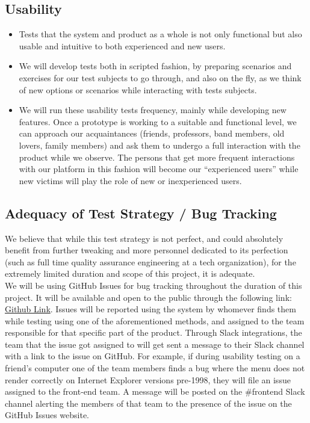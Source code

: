 \documentclass[11pt]{article}
\begin{document}
\subsection{Usability}
\begin{itemize}
    \item Tests that the system and product as a whole is not only functional but also usable and intuitive to both experienced and new users.
    \item We will develop tests both in scripted fashion, by preparing scenarios and exercises for our test subjects to go through, and also on the fly, as we think of new options or scenarios while interacting with tests subjects.
    \item We will run these usability tests frequency, mainly while developing new features. Once a prototype is working to a suitable and functional level, we can approach our acquaintances (friends, professors, band members, old lovers, family members) and ask them to undergo a full interaction with the product while we observe. The persons that get more frequent interactions with our platform in this fashion will become our ``experienced users'' while new victims will play the role of new or inexperienced users.
\end{itemize}

\subsection{Adequacy of Test Strategy / Bug Tracking}

We believe that while this test strategy is not perfect, and could absolutely benefit from further tweaking and more personnel dedicated to its perfection (such as full time quality assurance engineering at a tech organization), for the extremely limited duration and scope of this project, it is adequate.\\

We will be using GitHub Issues for bug tracking throughout the duration of this project. It will be available and open to the public through the following link: \href{https://github.com/aaronnech/CheckYourBias/issues}{Github Link}. Issues will be reported using the system by whomever finds them while testing using one of the aforementioned methods, and assigned to the team responsible for that specific part of the product. Through Slack integrations, the team that the issue got assigned to will get sent a message to their Slack channel with a link to the issue on GitHub. For example, if during usability testing on a friend’s computer one of the team members finds a bug where the menu does not render correctly on Internet Explorer versions pre-1998, they will file an issue assigned to the front-end team. A message will be posted on the \#frontend Slack channel alerting the members of that team to the presence of the issue on the GitHub Issues website.
\end{document}
